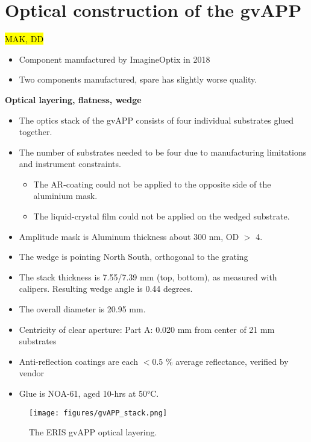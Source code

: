 \documentclass{aa}
\begin{document}
\section{Optical construction of the gvAPP}

\hl{MAK, DD}
\begin{itemize}
    \item Component manufactured by ImagineOptix in 2018
    \item Two components manufactured, spare has slightly worse quality.
\end{itemize}

\textbf{Optical layering, flatness, wedge}
\begin{itemize}
    \item The optics stack of the gvAPP consists of four individual substrates glued together.
    \item The number of substrates needed to be four due to manufacturing limitations and instrument constraints.
    \begin{itemize}
        \item The AR-coating could not be applied to the opposite side of the aluminium mask.
        \item The liquid-crystal film could not be applied on the wedged substrate.
    \end{itemize}
    \item Amplitude mask is Aluminum thickness about 300 nm, OD $>$ 4.
    \item The wedge is pointing North South, orthogonal to the grating
    \item The stack thickness is 7.55/7.39 mm (top, bottom), as measured with calipers. Resulting wedge angle is 0.44 degrees.
    \item The overall diameter is 20.95 mm.
    \item Centricity of clear aperture: Part A: 0.020 mm from center of 21 mm substrates
    \item Anti-reflection coatings are each $< 0.5$ \% average reflectance, verified by vendor
    \item Glue is NOA-61, aged 10-hrs at 50°C.
\end{itemize}



\begin{figure}
    \centering
    \texttt{[image: figures/gvAPP\_stack.png]}
    \caption{The ERIS gvAPP optical layering.}
    \label{fig:optical_layering}
\end{figure}
\end{document}
